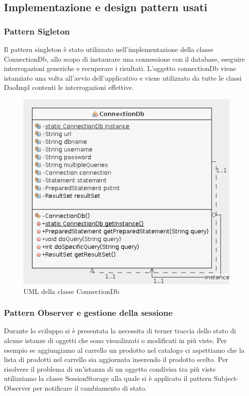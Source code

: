 \documentclass{article}
\begin{document}
\subsection{Implementazione e design pattern usati}
\newpage
\subsubsection{Pattern Sigleton}
Il pattern singleton è stato utilizzato nell'implementazione della classe ConnectionDb, allo scopo di
instaurare una connessione con il database, eseguire interrogazioni generiche e recuperare i risultati.
L'oggetto connectionDb viene istanziato una volta all'avvio dell'applicativo e viene utilizzato
da tutte le classi DaoImpl contenti le interrogazioni effettive.
\begin{figure}[h!]
	\centering
	\includegraphics[width=\textwidth]{UmlConnectionDb.png}
	\caption{UML della classe ConnectionDb}
	\label{fig:UmlProdotto}
\end{figure}
\newpage

\subsubsection{Pattern Observer e gestione della sessione}
Durante lo sviluppo si è presentata la necessita di terner traccia dello stato di alcune istanze di oggetti che
sono visualizzati o modificati in più viste.
Per esempio se aggiungiamo al carrello un prodotto nel catalogo ci aspettiamo che la lista di prodotti nel
carrello sia aggiornata inserendo il prodotto scelto.
Per risolvere il problema di un'istanza di un oggetto condivisa tra più viste utilizziamo la classe SessionStorage
alla quale si è applicato il pattern Subject-Observer per notificare il cambiamento di stato.
\end{document}
